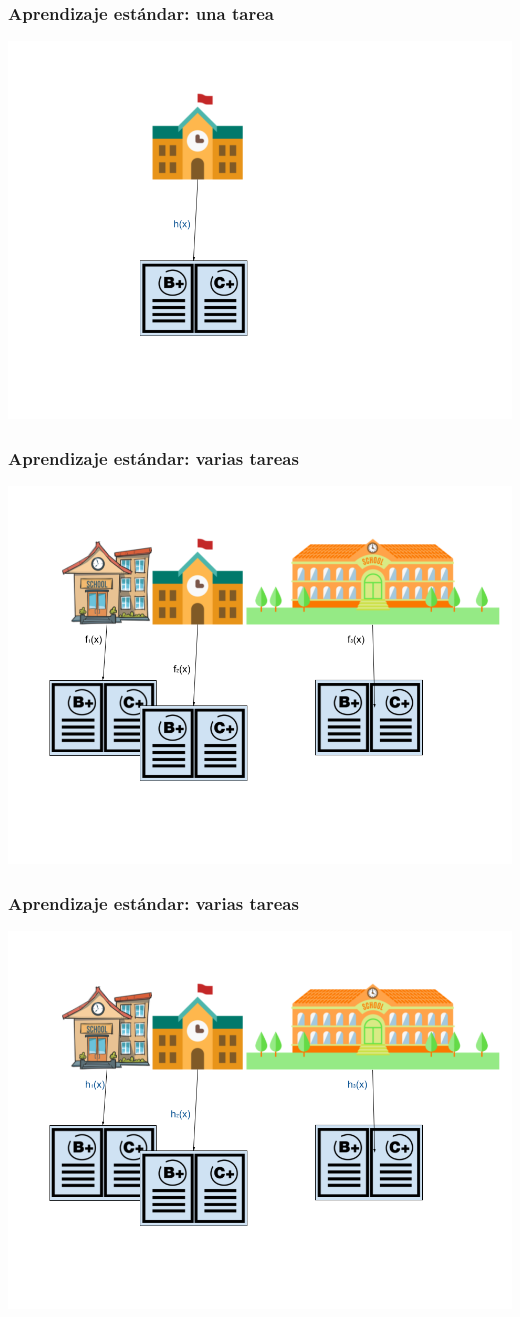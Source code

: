 \documentclass[aspectratio=43,spanish]{beamer}
\begin{document}
\begin{frame}
      \frametitle{Aprendizaje estándar: una tarea}

      \includegraphics[width=.8\textwidth]{Figures/schools_standard_hyp.png}

\end{frame}

\begin{frame}
      \frametitle{Aprendizaje estándar: varias tareas}

      \includegraphics[width=.8\textwidth]{Figures/schools_itl.png}

\end{frame}

\begin{frame}
      \frametitle{Aprendizaje estándar: varias tareas}

      \includegraphics[width=.8\textwidth]{Figures/schools_itl_hyp.png}

\end{frame}
\end{document}
